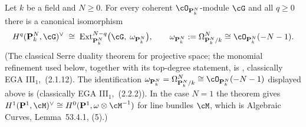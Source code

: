 \begin{theorem}
\label{thm:pc-serre-duality-pn}
Let $k$ be a field and $N\ge0$.  For every coherent
$\cO_{\mathbf P^N_k}$-module $\cG$ and all $q\ge0$ there is a
canonical isomorphism
\[
H^q(\mathbf P^N_k,\cG)^{\vee}
\;\cong\;\operatorname{Ext}^{N-q}_{\mathbf P^N_k}\bigl(\cG,\;\omega_{\mathbf P^N_k}\bigr),
\qquad
\omega_{\mathbf P^N_k}:=\Omega_{\mathbf P^N_k/k}^{N}\cong
\cO_{\mathbf P^N_k}(-N-1).
\]
(The classical Serre duality theorem for projective space; the
monomial refinement used below, together with its top-degree statement,
is , classically
EGA III$_1$, \,(2.1.12).  The identification
$\omega_{\mathbf P^N_k}=\Omega^{N}_{\mathbf P^N_k/k}\cong
\cO_{\mathbf P^N_k}(-N-1)$ displayed above is
 (classically
EGA III$_1$, \,(2.2.2)).  In the case $N=1$ the
theorem gives $H^1(\mathbf P^1,\cM)^{\vee}\cong
H^0(\mathbf P^1,\omega\otimes\cM^{-1})$ for line bundles $\cM$,
which is Algebraic Curves, Lemma~53.4.1,
(5).)
\end{theorem}
